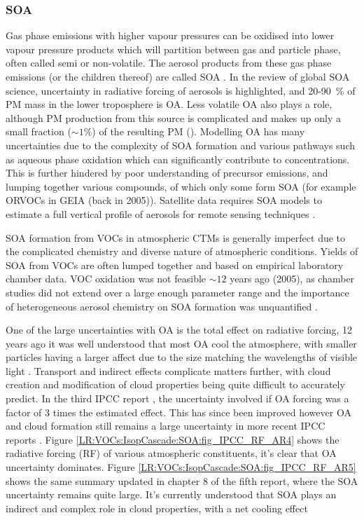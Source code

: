     \subsubsection{SOA}
    \label{LR:VOCs:IsopCascade:SOA}
    Gas phase emissions with higher vapour pressures can be oxidised into lower vapour pressure products which will partition between gas and particle phase, often called semi or non-volatile. 
    The aerosol products from these gas phase emissions (or the children thereof) are called SOA \citep{Kanakidou2005}.
    In the \cite{Kanakidou2005} review of global SOA science, uncertainty in radiative forcing of aerosols is highlighted, and 20-90~\% of PM mass in the lower troposphere is OA.
    Less volatile OA also plays a role, although PM production from this source is complicated and makes up only a small fraction ($\sim 1 \%$) of the resulting PM (\cite{Kroll2008, Bei2012}).
    Modelling OA has many uncertainties due to the complexity of SOA formation and various pathways such as aqueous phase oxidation which can significantly contribute to concentrations.
    This is further hindered by poor understanding of precursor emissions, and lumping together various compounds, of which only some form SOA (for example ORVOCs in GEIA (back in 2005)).
    Satellite data requires SOA models to estimate a full vertical profile of aerosols for remote sensing techniques \citep{Kanakidou2005}.
    
    SOA formation from VOCs in atmospheric CTMs is generally imperfect due to the complicated chemistry and diverse nature of atmospheric conditions.
    Yields of SOA from VOCs are often lumped together and based on empirical laboratory chamber data. 
    VOC oxidation was not feasible $\sim 12$ years ago (2005), as chamber studies did not extend over a large enough parameter range and the importance of heterogeneous aerosol chemistry on SOA formation was unquantified \citep{Kanakidou2005}.
    
    One of the large uncertainties with OA is the total effect on radiative forcing, 12 years ago it was well understood that most OA cool the atmosphere, with smaller particles having a larger affect due to the size matching the wavelengths of visible light \citep{Kanakidou2005}. 
    Transport and indirect effects complicate matters further, with cloud creation and modification of cloud properties being quite difficult to accurately predict.
    In the third IPCC report \citep{IPCC2001}, the uncertainty involved if OA forcing was a factor of 3 times the estimated effect. 
    This has since been improved however OA and cloud formation still remains a large uncertainty in more recent IPCC reports \citep{IPCC_Chapter2}.
    Figure \ref{LR:VOCs:IsopCascade:SOA:fig_IPCC_RF_AR4} shows the radiative forcing (RF) of various atmospheric constituents, it's clear that OA uncertainty dominates.
    Figure \ref{LR:VOCs:IsopCascade:SOA:fig_IPCC_RF_AR5} shows the same summary updated in chapter 8 of the fifth report, where the SOA uncertainty remains quite large.
    It's currently understood that SOA plays an indirect and complex role in cloud properties, with a net cooling effect \citep[Chapter 7,8]{IPCC_AR5_WG1}
    
